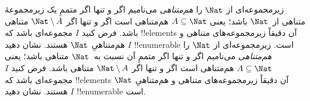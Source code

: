  {
  زیرمجموعه‌ای از $\Nat$ را \emph{هم‌متناهی} می‌نامیم اگر و تنها اگر
  متممِ یک زیرمجموعهٔ متناهی از~$\Nat$ باشد؛ یعنی $A \subseteq \Nat$
  هم‌متناهی است اگر و تنها اگر $\Nat\setminus A$ متناهی باشد. فرض کنید
  $I$ مجموعه‌ای باشد که !!{element}s آن دقیقاً زیرمجموعه‌های متناهی و
  هم‌متناهیِ $\Nat$ هستند. نشان دهید $I$ !!{enumerable} است.
 }
 {
  زیرمجموعه‌ای از $\Nat$ را \emph{هم‌متناهی} می‌نامیم اگر و تنها اگر
  متممِ آن نسبت به~$\Nat$ متناهی باشد؛ یعنی $A \subseteq \Nat$
  هم‌متناهی است اگر و تنها اگر $\Nat\setminus A$ متناهی باشد. فرض کنید
  $I$ مجموعه‌ای باشد که !!{element}s آن دقیقاً زیرمجموعه‌های متناهی و
  هم‌متناهیِ $\Nat$ هستند. نشان دهید $I$ !!{enumerable} است.
 }

